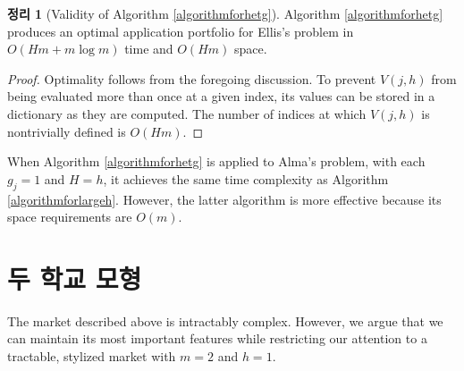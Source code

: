 \documentclass[12pt]{article} %
\newif\ifEN
\newtheorem{theorem}{Theorem}
\theoremstyle{definition}
\newtheorem{theorem}{정리}
\theoremstyle{definition}
\begin{document}
\begin{theorem}[Validity of Algorithm \ref{algorithmforhetg}]
Algorithm \ref{algorithmforhetg} produces an optimal application portfolio for Ellis's problem in $O(H m + m \log m)$ time and $O(H m)$ space.
\end{theorem}

\begin{proof}
Optimality follows from the foregoing discussion. To prevent $V(j, h)$ from being evaluated more than once at a given index, its values can be stored in a dictionary as they are computed. The number of indices at which $V(j, h)$ is nontrivially defined is $O(Hm)$.
\end{proof}

When Algorithm \ref{algorithmforhetg} is applied to Alma's problem, with each $g_j = 1$ and $H =h$, it achieves the same time complexity as Algorithm \ref{algorithmforlargeh}. However, the latter algorithm is more effective because its space requirements are $O(m)$. 



























\ifEN \section{Two-school model} \else \section{두 학교 모형} \fi
The market described above is intractably complex. However, we argue that we can maintain its most important features while restricting our attention to a tractable, stylized market with $m=2$ and $h=1$. 
\end{document}
